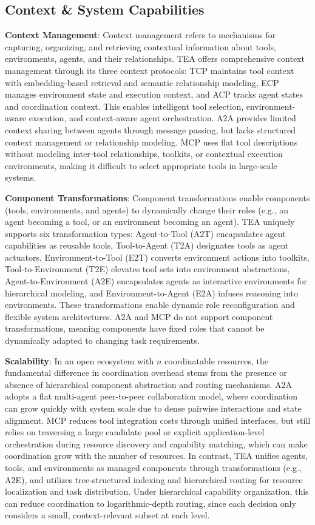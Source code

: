\documentclass[11pt]{article}
\begin{document}
\subsection{Context \& System Capabilities}

\textbf{Context Management}: Context management refers to mechanisms for capturing, organizing, and retrieving contextual information about tools, environments, agents, and their relationships. TEA offers comprehensive context management through its three context protocols: TCP maintains tool context with embedding-based retrieval and semantic relationship modeling, ECP manages environment state and execution context, and ACP tracks agent states and coordination context. This enables intelligent tool selection, environment-aware execution, and context-aware agent orchestration. A2A provides limited context sharing between agents through message passing, but lacks structured context management or relationship modeling. MCP uses flat tool descriptions without modeling inter-tool relationships, toolkits, or contextual execution environments, making it difficult to select appropriate tools in large-scale systems.

\textbf{Component Transformations}: Component transformations enable components (tools, environments, and agents) to dynamically change their roles (e.g., an agent becoming a tool, or an environment becoming an agent). TEA uniquely supports six transformation types: Agent-to-Tool (A2T) encapsulates agent capabilities as reusable tools, Tool-to-Agent (T2A) designates tools as agent actuators, Environment-to-Tool (E2T) converts environment actions into toolkits, Tool-to-Environment (T2E) elevates tool sets into environment abstractions, Agent-to-Environment (A2E) encapsulates agents as interactive environments for hierarchical modeling, and Environment-to-Agent (E2A) infuses reasoning into environments. These transformations enable dynamic role reconfiguration and flexible system architectures. A2A and MCP do not support component transformations, meaning components have fixed roles that cannot be dynamically adapted to changing task requirements.

\textbf{Scalability}: In an open ecosystem with $n$ coordinatable resources, the fundamental difference in coordination overhead stems from the presence or absence of hierarchical component abstraction and routing mechanisms. A2A adopts a flat multi-agent peer-to-peer collaboration model, where coordination can grow quickly with system scale due to dense pairwise interactions and state alignment. MCP reduces tool integration costs through unified interfaces, but still relies on traversing a large candidate pool or explicit application-level orchestration during resource discovery and capability matching, which can make coordination grow with the number of resources. In contrast, TEA unifies agents, tools, and environments as managed components through transformations (e.g., A2E), and utilizes tree-structured indexing and hierarchical routing for resource localization and task distribution. Under hierarchical capability organization, this can reduce coordination to logarithmic-depth routing, since each decision only considers a small, context-relevant subset at each level.
\end{document}
